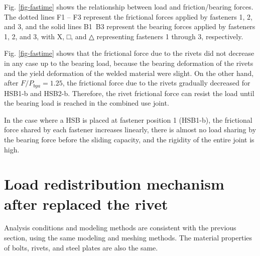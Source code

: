 Fig. \ref{fig-fastime} shows the relationship between load and friction/bearing forces. The dotted lines F1 -- F3 represent the frictional forces applied by fasteners 1, 2, and 3, and the solid lines B1~B3 represent the bearing forces applied by fasteners 1, 2, and 3, with X, □, and △ representing fasteners 1 through 3, respectively.

Fig. \ref{fig-fastime} shows that the frictional force due to the rivets did not decrease in any case up to the bearing load, because the bearing deformation of the rivets and the yield deformation of the welded material were slight. On the other hand, after $F / P_{bya}  = 1.25$, the frictional force due to the rivets gradually decreased for HSB1-b and HSB2-b. Therefore, the rivet frictional force can resist the load until the bearing load is reached in the combined use joint.

In the case where a \ac{HSB} is placed at fastener position 1 (HSB1-b), the frictional force shared by each fastener increases linearly, there is almost no load sharing by the bearing force before the sliding capacity, and the rigidity of the entire joint is high.



\section{Load redistribution mechanism after replaced the rivet}

Analysis conditions and modeling methods are consistent with the previous section, using the same modeling and meshing methods. The material properties of bolts, rivets, and steel plates are also the same.




